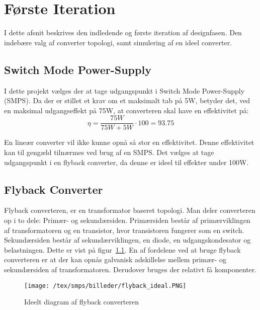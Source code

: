
\chapter{Første Iteration}
I dette afsnit beskrives den indledende og første iteration af designfasen. Den indebære valg af converter topologi, samt simulering af en ideel converter.

\section{Switch Mode Power-Supply}
I dette projekt vælges der at tage udgangspunkt i Switch Mode Power-Supply (SMPS). Da der er stillet et krav om et maksimalt tab på 5W, betyder det, ved en maksimal udgangseffekt på 75W, at converteren skal have en effektivitet på:
\begin{equation}
	\eta = \frac{75W}{75W + 5W} \cdot 100 = 93.75
\end{equation}

En lineær converter vil ikke kunne opnå så stor en effektivitet. Denne effektivitet kan til gengæld tilnærmes ved brug af en SMPS. Det vælges at tage udgangspunkt i en flyback converter, da denne er ideel til effekter under 100W. 


\section{Flyback Converter}
Flyback converteren, er en transformator baseret topologi. Man deler converteren op i to dele: Primær- og sekundærsiden. Primærsiden består af primærviklingen af transformatoren og en transistor, hvor transistoren fungerer som en switch. Sekundærsiden består af sekundærviklingen, en diode, en udgangskondesator og belastningen. Dette er vist på figur~\ref{fig:flyback_ideal}. En af fordelene ved at bruge flyback converteren er at der kan opnås galvanisk adskillelse mellem primær- og sekundærsiden af transformatoren. Derudover bruges der relativt få komponenter.

\begin{figure}[H]
	\center
	\texttt{[image: /tex/smps/billeder/flyback\_ideal.PNG]}
	\caption{Ideelt diagram af flyback converteren
	\cite{SMPS-topologies}}
	\label{fig:flyback_ideal}
\end{figure} 

